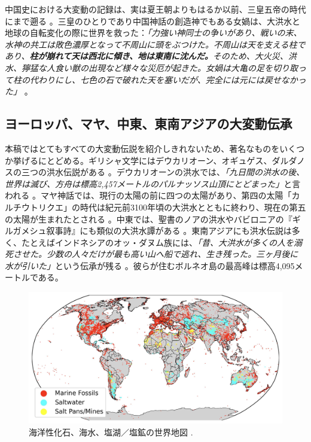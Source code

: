 \documentclass[10pt,twocolumn,letterpaper]{article}
\begin{document}
中国史における大変動の記録は、実は夏王朝よりもはるか以前、三皇五帝の時代にまで遡る \cite{7}。三皇のひとりであり中国神話の創造神でもある女媧は、大洪水と地球の自転変化の際に世界を救った：\textit{「力強い神同士の争いがあり、戦いの末、水神の共工は敗色濃厚となって不周山に頭をぶつけた。不周山は天を支える柱であり、\textbf{柱が崩れて天は西北に傾き、地は東南に沈んだ。}そのため、大火災、洪水、獰猛な人食い獣の出現など様々な災厄が起きた。女媧は大亀の足を切り取って柱の代わりにし、七色の石で破れた天を塞いだが、完全には元には戻せなかった」} \cite{8}。

\subsection{ヨーロッパ、マヤ、中東、東南アジアの大変動伝承}

本稿ではとてもすべての大変動伝説を紹介しきれないため、著名なものをいくつか挙げるにとどめる。ギリシャ文学にはデウカリオーン、オギュゲス、ダルダノスの三つの洪水伝説がある \cite{9,10}。デウカリオーンの洪水では、\textit{「九日間の洪水の後、世界は滅び、方舟は標高2,457メートルのパルナッソス山頂にとどまった」}と言われる \cite{11}。マヤ神話では、現行の太陽の前に四つの太陽があり、第四の太陽「カルチウトリクエ」の時代は紀元前3100年頃の大洪水とともに終わり、現在の第五の太陽が生まれたとされる \cite{12}。中東では、聖書のノアの洪水やバビロニアの『ギルガメシュ叙事詩』にも類似の大洪水譚がある \cite{13}。東南アジアにも洪水伝説は多く、たとえばインドネシアのオッ・ダヌム族には、\textit{「昔、大洪水が多くの人を溺死させた。少数の人々だけが最も高い山へ船で逃れ、生き残った。三ヶ月後に水が引いた」}という伝承が残る \cite{3}。彼らが住むボルネオ島の最高峰は標高4,095メートルである。

\begin{figure}[b]
\begin{center}
\includegraphics[width=1\textwidth]{marine.jpg}
\end{center}
   \caption{海洋性化石、海水、塩湖／塩鉱の世界地図 \cite{15,16,86,87}.}

   \label{fig:2}
\end{figure}
\end{document}
